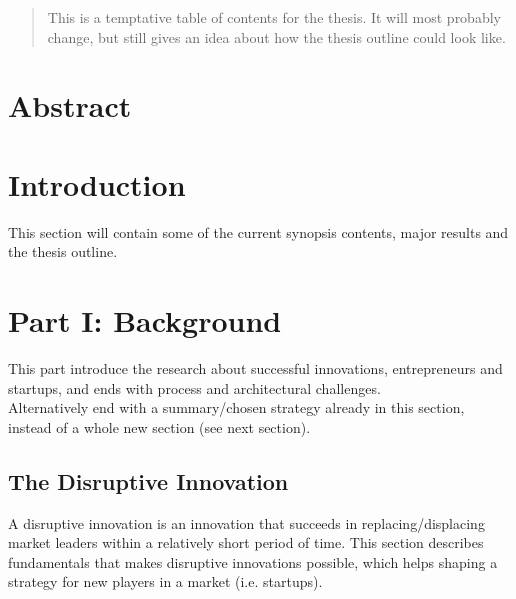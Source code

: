 \documentclass[a4paper,10pt]{article}
\begin{document}
\begin{abstract}
This is a temptative table of contents for the thesis. It will most probably change, but still gives an idea about how the thesis outline could look like.
\end{abstract}
  
\section{Abstract}
\section{Introduction}
This section will contain some of the current synopsis contents, major results and the thesis outline.

\section{Part I: Background}
This part introduce the research about successful innovations, entrepreneurs and startups, and ends with process and architectural challenges.
\\
Alternatively end with a summary/chosen strategy already in this section, instead of a whole new section (see next section).

\subsection{The Disruptive Innovation}
A disruptive innovation is an innovation that succeeds in replacing/displacing market leaders within a relatively short period of time.
This section describes fundamentals that makes disruptive innovations possible, which helps shaping a strategy for new players in a market (i.e. startups).
\end{document}
